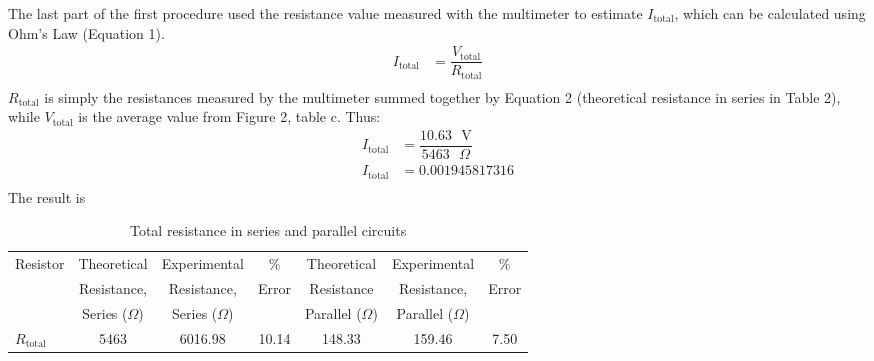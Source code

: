 \documentclass [12pt, letterpaper, twoside] {article}
\begin{document}
The last part of the first procedure used the resistance value measured with the multimeter to estimate \(I_{\text{total}}\), which can be calculated using Ohm's Law (Equation 1).
\begin{equation}
  \begin{split}
    I_{\text{total}} &= \dfrac{V_{\text{total}}}{R_{\text{total}}} \\
  \end{split}
\end{equation}
\(R_{\text{total}}\) is simply the resistances measured by the multimeter summed together by Equation 2 (theoretical resistance in series in Table 2), while \(V_{\text{total}}\) is the average value from Figure 2, table c. Thus:
\begin{equation*}
  \begin{split}
    I_{\text{total}} &= \dfrac{10.63\text{ }\text{V}}{5463\text{ }\Omega} \\
    I_{\text{total}} &= 0.001945817316 \\
  \end{split}
\end{equation*}
The result is 

\begin{table}
  \centering
  \begin{tabular}{| l | c | c | c | c | c | c |}
    \hline\hline
    \multirow {3}{*}{Resistor} & Theoretical & Experimental & \% & Theoretical & Experimental & \% \\
    & Resistance, & Resistance, & Error & Resistance & Resistance, & Error \\
    & Series (\(\Omega\)) & Series (\(\Omega\)) & & Parallel (\(\Omega\)) & Parallel (\(\Omega\)) & \\
    \hline
    \(R_{\text{total}}\) & 5463 & 6016.98 & 10.14 & 148.33 & 159.46 & 7.50 \\ %
    \hline\hline
  \end{tabular}
  \caption{Total resistance in series and parallel circuits}
\end{table}

\distanceAndCharge
\end{document}
